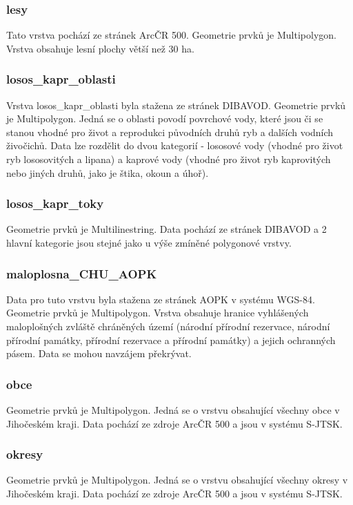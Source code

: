\documentclass[a4paper, 12pt]{article}
\begin{document}
\subsubsection{lesy}
Tato vrstva pochází ze stránek ArcČR 500. Geometrie prvků je Multipolygon. Vrstva obsahuje lesní plochy větší než 30 ha. 

\subsubsection{losos\_kapr\_oblasti}
Vrstva losos\_kapr\_oblasti byla stažena ze stránek DIBAVOD. Geometrie prvků je Multipolygon. Jedná se o oblasti povodí povrchové vody, které jsou či se stanou vhodné pro život a reprodukci původních druhů ryb a dalších vodních živočichů. Data lze rozdělit do dvou kategorií - lososové vody (vhodné pro život ryb lososovitých a lipana) a kaprové vody (vhodné pro život ryb kaprovitých nebo jiných druhů, jako je štika, okoun a úhoř). 


\subsubsection{losos\_kapr\_toky}
Geometrie prvků je Multilinestring. Data pochází ze stránek DIBAVOD a 2 hlavní kategorie jsou stejné jako u výše zmíněné polygonové vrstvy.


\subsubsection{maloplosna\_CHU\_AOPK}
Data pro tuto vrstvu byla stažena ze stránek AOPK v systému WGS-84. Geometrie prvků je Multipolygon. Vrstva obsahuje hranice vyhlášených maloplošných zvláště chráněných území (národní přírodní rezervace, národní přírodní památky, přírodní rezervace a přírodní památky) a jejich ochranných pásem. Data se mohou navzájem překrývat. 


\subsubsection{obce}
Geometrie prvků je Multipolygon. Jedná se o vrstvu obsahující všechny obce v Jihočeském kraji. Data pochází ze zdroje ArcČR 500 a jsou v systému S-JTSK.

\subsubsection{okresy}
Geometrie prvků je Multipolygon. Jedná se o vrstvu obsahující všechny okresy v Jihočeském kraji. Data pochází ze zdroje ArcČR 500 a jsou v systému S-JTSK.
\end{document}
